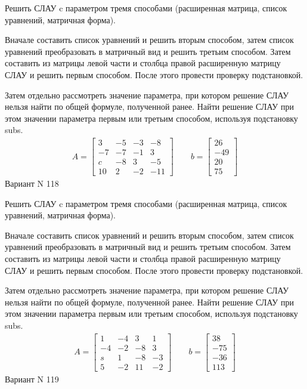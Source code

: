 \documentclass[11pt]{report}
\begin{document}
Решить СЛАУ c параметром тремя способами (расширенная матрица, список уравнений, матричная форма).

Вначале составить список уравнений и решить вторым способом,
затем список уравнений преобразовать в матричный вид и решить третьим способом.
Затем составить из матрицы левой части и столбца правой расширенную матрицу СЛАУ и решить первым способом.
После этого провести проверку подстановкой.

Затем отдельно рассмотреть значение параметра, при котором решение СЛАУ нельзя найти по общей формуле,
полученной ранее.
Найти решение СЛАУ при этом значении параметра первым или третьим способом, используя подстановку subs.
\begin{align*}
    A = \left[\begin{matrix}3 & -5 & -3 & -8\\-7 & -7 & -1 & 3\\c & -8 & 3 & -5\\10 & 2 & -2 & -11\end{matrix}\right]
\qquad b = \left[\begin{matrix}26\\-49\\20\\75\end{matrix}\right]
\end{align*}
\newpage
Вариант N 118


Решить СЛАУ c параметром тремя способами (расширенная матрица, список уравнений, матричная форма).

Вначале составить список уравнений и решить вторым способом,
затем список уравнений преобразовать в матричный вид и решить третьим способом.
Затем составить из матрицы левой части и столбца правой расширенную матрицу СЛАУ и решить первым способом.
После этого провести проверку подстановкой.

Затем отдельно рассмотреть значение параметра, при котором решение СЛАУ нельзя найти по общей формуле,
полученной ранее.
Найти решение СЛАУ при этом значении параметра первым или третьим способом, используя подстановку subs.
\begin{align*}
    A = \left[\begin{matrix}1 & -4 & 3 & 1\\-4 & -2 & -8 & 3\\s & 1 & -8 & -3\\5 & -2 & 11 & -2\end{matrix}\right]
\qquad b = \left[\begin{matrix}38\\-75\\-36\\113\end{matrix}\right]
\end{align*}
\newpage
Вариант N 119
\end{document}
